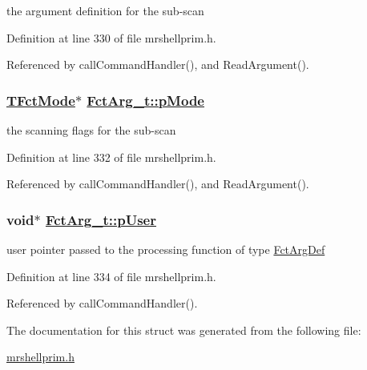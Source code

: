 the argument definition for the sub-scan 



Definition at line 330 of file mrshellprim.h.

Referenced by call\-Command\-Handler(), and Read\-Argument().\hypertarget{structFctArg__t_b84bb7d22c66809af5f97b860c3f818e}{
\subsubsection[pMode]{\setlength{\rightskip}{0pt plus 5cm}\hyperlink{structFctMode__t}{TFct\-Mode}$\ast$ \hyperlink{structFctArg__t_b84bb7d22c66809af5f97b860c3f818e}{Fct\-Arg\_\-t::p\-Mode}}}
\label{structFctArg__t_b84bb7d22c66809af5f97b860c3f818e}


the scanning flags for the sub-scan 



Definition at line 332 of file mrshellprim.h.

Referenced by call\-Command\-Handler(), and Read\-Argument().\hypertarget{structFctArg__t_9369def59ef9b0c2510fe77f075c8bca}{
\subsubsection[pUser]{\setlength{\rightskip}{0pt plus 5cm}void$\ast$ \hyperlink{structFctArg__t_9369def59ef9b0c2510fe77f075c8bca}{Fct\-Arg\_\-t::p\-User}}}
\label{structFctArg__t_9369def59ef9b0c2510fe77f075c8bca}


user pointer passed to the processing function of type \hyperlink{mrshellprim_8h_1c9f7567aaf5693ef8473ff91ccb8ff5}{Fct\-Arg\-Def} 



Definition at line 334 of file mrshellprim.h.

Referenced by call\-Command\-Handler().

The documentation for this struct was generated from the following file:\begin{CompactItemize}
\item 
\hyperlink{mrshellprim_8h}{mrshellprim.h}\end{CompactItemize}
